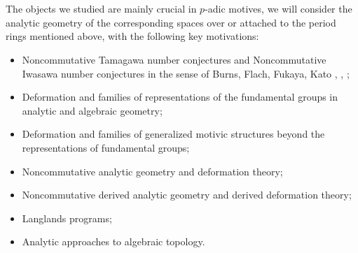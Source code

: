 \documentclass[11pt]{report}
\begin{document}
 



\newpage
\section{}

\indent The objects we studied are mainly crucial in $p$-adic motives, we will consider the analytic geometry of the corresponding spaces over or attached to the period rings mentioned above, with the following key motivations:
\begin{itemize}
\justifying
\item<1-> Noncommutative Tamagawa number conjectures and Noncommutative Iwasawa number conjectures in the sense of Burns, Flach, Fukaya, Kato \cite{BF1}, \cite{BF2}, \cite{FK}; 
\item<2-> Deformation and families of representations of the fundamental groups in analytic and algebraic geometry; 
\item<3-> Deformation and families of generalized motivic structures beyond the representations of fundamental groups;
\item<4-> Noncommutative analytic geometry and deformation theory;
\item<5-> Noncommutative derived analytic geometry and derived deformation theory;
\item<6-> Langlands programs;
\item<7-> Analytic approaches to algebraic topology.
\end{itemize}
 

\



\\
\end{document}
